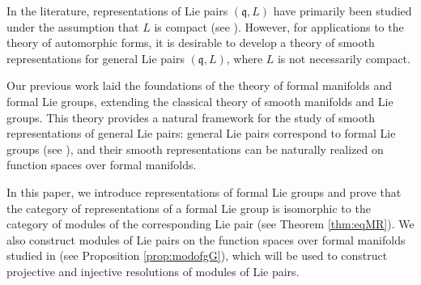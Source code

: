 \documentclass[12pt, a4paper]{amsart}
\newcommand{\q}{\mathfrak q}
\renewcommand{\l}{\mathfrak l}
\theoremstyle{Theorem}
\theoremstyle{Theorem}
\theoremstyle{Theorem}
\theoremstyle{Theorem}
\theoremstyle{Plain}
\theoremstyle{remark}
\theoremstyle{remark}
\theoremstyle{Definition}
\numberwithin{equation}{section}
\begin{document}

In the literature, representations of Lie pairs $(\mathfrak{q},L)$ have primarily been studied under the assumption that $L$ is compact (see \cite{KV}). However, for applications to the theory of automorphic forms, it is desirable to develop a theory of smooth representations for general Lie pairs $(\mathfrak{q},L)$, where $L$ is not necessarily compact. 

Our previous work \cite{CSW1, CSW2, CSW3, CSW4} laid the foundations of the theory of formal manifolds and formal Lie groups, extending the classical theory of smooth manifolds and Lie groups. This theory provides a natural framework for the study of smooth representations of general Lie pairs: general Lie pairs correspond to formal Lie groups (see \cite[Theorem 1.11]{CSW4}), and their smooth representations can be naturally realized on function spaces over formal manifolds.

In this paper, we introduce representations of formal Lie groups and prove that the category of representations of a formal Lie group is isomorphic to the category of modules of the corresponding Lie pair (see Theorem \ref{thm:eqMR}). We also construct modules of Lie pairs on the function spaces over formal manifolds studied in \cite{CSW2} (see Proposition \ref{prop:modofgG}), which will be used to construct projective and injective resolutions of modules of Lie pairs.
\end{document}

